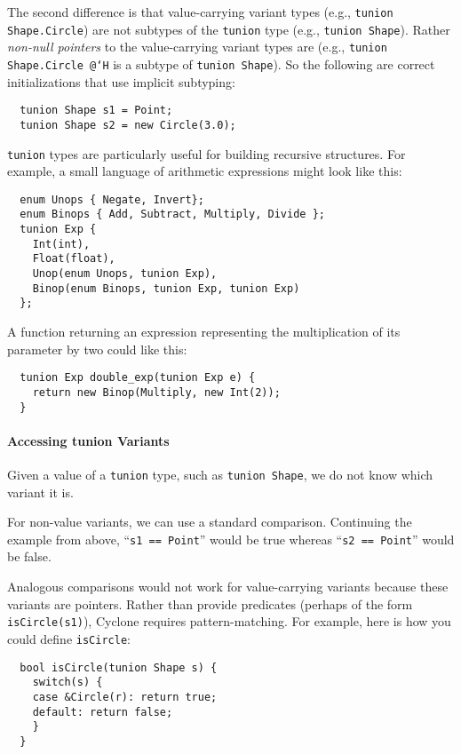 The second difference is that value-carrying variant types (e.g.,
\texttt{tunion Shape.Circle}) are not subtypes of the \texttt{tunion} type
(e.g., \texttt{tunion Shape}).  Rather \textit{non-null pointers} to the
value-carrying variant types are (e.g., \texttt{tunion Shape.Circle @`H}
is a subtype of \texttt{tunion Shape}).  So the following are correct
initializations that use implicit subtyping:

\begin{verbatim}
  tunion Shape s1 = Point;
  tunion Shape s2 = new Circle(3.0);
\end{verbatim}

\texttt{tunion} types are particularly useful for building recursive
structures.  For example, a small language of arithmetic expressions
might look like this:
\begin{verbatim}
  enum Unops { Negate, Invert};
  enum Binops { Add, Subtract, Multiply, Divide };
  tunion Exp {
    Int(int),
    Float(float),
    Unop(enum Unops, tunion Exp),
    Binop(enum Binops, tunion Exp, tunion Exp)
  };
\end{verbatim}

A function returning an expression representing the multiplication of
its parameter by two could like this:
\begin{verbatim}
  tunion Exp double_exp(tunion Exp e) {
    return new Binop(Multiply, new Int(2));
  }
\end{verbatim}

\paragraph{Accessing tunion Variants} Given a value of a \texttt{tunion}
type, such as \texttt{tunion Shape}, we do not know which variant it is.

For non-value variants, we can use a standard comparison.  Continuing
the example from above, ``\texttt{s1 == Point}'' would be true whereas
``\texttt{s2 == Point}'' would be false.

Analogous comparisons would not work for value-carrying variants
because these variants are pointers.  Rather than provide predicates
(perhaps of the form \texttt{isCircle(s1)}), Cyclone requires
pattern-matching.  For example, here is how you could define
\texttt{isCircle}:
\begin{verbatim}
  bool isCircle(tunion Shape s) {
    switch(s) {
    case &Circle(r): return true;
    default: return false;
    }
  }
\end{verbatim}

